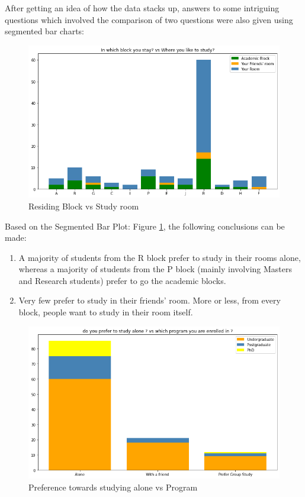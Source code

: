 \documentclass[12pt,onecolumn,letterpaper]{article}
\begin{document}
After getting an idea of how the data stacks up, answers to some intriguing questions which involved the comparison of two questions were also given using segmented bar charts:

\begin{figure}[h]
    \centering
    \includegraphics[scale=0.6]{output2.png}
    \caption{Residing Block vs Study room}
    \label{fig:stay_study}
\end{figure}
Based on the Segmented Bar Plot: Figure \ref{fig:stay_study}, the following conclusions can be made:
\begin{enumerate}
    \item A majority of students from the R block prefer to study in their rooms alone, whereas a majority of students from the P block (mainly involving Masters and Research students) prefer to go the academic blocks.
    \item Very few prefer to study in their friends' room. More or less, from every block, people want to study in their room itself.
\end{enumerate}
\newpage
\begin{figure}[h]
    \centering
    \includegraphics[scale=0.5]{output4.png}
    \caption{Preference towards studying alone vs Program}
    \label{fig:program_study}
\end{figure}
\end{document}
